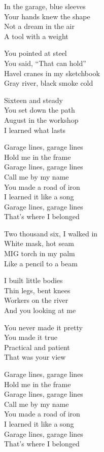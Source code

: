 \begin{lyrics}
In the garage, blue sleeves\\
Your hands knew the shape\\
Not a dream in the air\\
A tool with a weight

You pointed at steel\\
You said, “That can hold”\\
Havel cranes in my sketchbook\\
Gray river, black smoke cold

Sixteen and steady\\
You set down the path\\
August in the workshop\\
I learned what lasts

Garage lines, garage lines\\
Hold me in the frame\\
Garage lines, garage lines\\
Call me by my name\\
You made a road of iron\\
I learned it like a song\\
Garage lines, garage lines\\
That’s where I belonged

Two thousand six, I walked in\\
White mask, hot seam\\
MIG torch in my palm\\
Like a pencil to a beam

I built little bodies\\
Thin legs, bent knees\\
Workers on the river\\
And you looking at me

You never made it pretty\\
You made it true\\
Practical and patient\\
That was your view

Garage lines, garage lines\\
Hold me in the frame\\
Garage lines, garage lines\\
Call me by my name\\
You made a road of iron\\
I learned it like a song\\
Garage lines, garage lines\\
That’s where I belonged


\end{lyrics}
